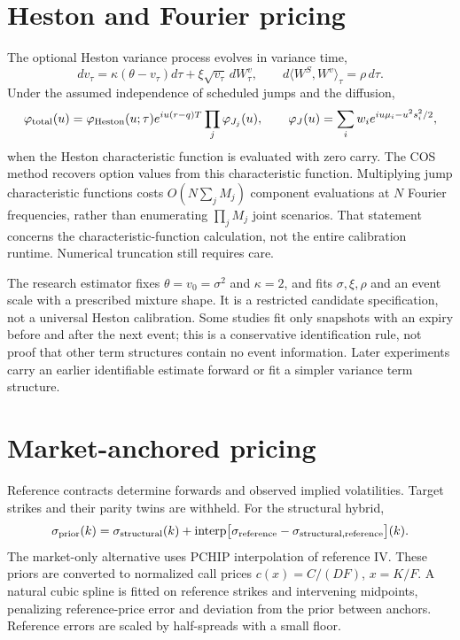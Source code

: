 \documentclass[11pt]{article}
\begin{document}
\section{Heston and Fourier pricing}
The optional Heston variance process evolves in variance time,
\[
 dv_\tau=\kappa(\theta-v_\tau)d\tau+\xi\sqrt{v_\tau}\,dW^v_\tau,
 \qquad d\langle W^S,W^v\rangle_\tau=\rho\,d\tau.
\]
Under the assumed independence of scheduled jumps and the diffusion,
\[
 \varphi_{\rm total}(u)=\varphi_{\rm Heston}(u;\tau)
     e^{iu(r-q)T}\prod_j\varphi_{J_j}(u),\qquad
 \varphi_J(u)=\sum_iw_i e^{iu\mu_i-u^2s_i^2/2},
\]
when the Heston characteristic function is evaluated with zero carry. The COS
method recovers option values from this characteristic function. Multiplying
jump characteristic functions costs $O(N\sum_j M_j)$ component evaluations at
$N$ Fourier frequencies, rather than enumerating $\prod_j M_j$ joint scenarios.
That statement concerns the characteristic-function calculation, not the entire
calibration runtime. Numerical truncation still requires care.

The research estimator fixes $\theta=v_0=\sigma^2$ and $\kappa=2$, and fits
$\sigma,\xi,\rho$ and an event scale with a prescribed mixture shape. It is a
restricted candidate specification, not a universal Heston calibration.
Some studies fit only snapshots with an expiry before and after the next event;
this is a conservative identification rule, not proof that other term structures
contain no event information. Later experiments carry an earlier identifiable
estimate forward or fit a simpler variance term structure.

\section{Market-anchored pricing}
Reference contracts determine forwards and observed implied volatilities.
Target strikes and their parity twins are withheld. For the structural hybrid,
\[
 \sigma_{\rm prior}(k)=\sigma_{\rm structural}(k)
 +\operatorname{interp}\bigl[\sigma_{\rm reference}
                           -\sigma_{\rm structural,reference}\bigr](k).
\]
The market-only alternative uses PCHIP interpolation of reference IV. These
priors are converted to normalized call prices $c(x)=C/(DF)$, $x=K/F$.
A natural cubic spline is fitted on reference strikes and intervening midpoints,
penalizing reference-price error and deviation from the prior between anchors.
Reference errors are scaled by half-spreads with a small floor.
\end{document}
